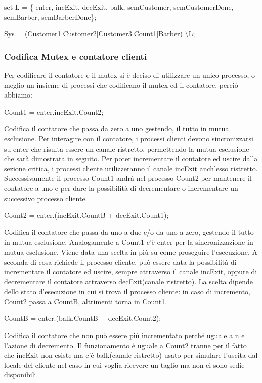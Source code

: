 \textsf{set L = \{ enter, incExit, decExit, balk, semCustomer, semCustomerDone, semBarber, semBarberDone\}};

\textsf{Sys = (Customer1|Customer2|Customer3|Count1|Barber) \textbackslash L;}

\subsubsection{Codifica Mutex e contatore clienti}

Per codificare il contatore e il \textsf{mutex} si è deciso di utilizzare un unico processo, o meglio un insieme di processi che codificano il \textsf{mutex} ed il contatore, perciò abbiamo: 

\textsf{Count1 = enter.incExit.Count2;}

Codifica il contatore che passa da zero a uno gestendo, il tutto in mutua esclusione. Per interagire con il contatore, i processi clienti devono sincronizzarsi su \textsf{enter} che risulta essere un canale ristretto, permettendo la mutua esclusione che sarà dimostrata in seguito. Per poter incrementare il contatore ed uscire dalla sezione critica, i processi cliente utilizzeranno il canale \textsf{incExit} anch'esso ristretto. Successivamente il processo \textsf{Count1} andrà nel processo \textsf{Count2} per mantenere il contatore a uno e per dare la possibilità di decrementare o incrementare un successivo processo cliente.

\textsf{Count2 = enter.(incExit.CountB + decExit.Count1);}

Codifica il contatore che passa da uno a due e/o da uno a zero, gestendo il tutto in mutua esclusione. Analogamente a \textsf{Count1} c'è \textsf{enter} per la sincronizzazione in mutua esclusione. Viene data una scelta in più su come proseguire l'esecuzione. A seconda di cosa richiede il processo cliente, può essere data la possibilità di incrementare il contatore ed uscire, sempre attraverso il canale \textsf{incExit}, oppure di decrementare il contatore attraverso \textsf{decExit}(canale ristretto). La scelta dipende dello stato d'esecuzione in cui si trova il processo cliente: in caso di incremento, \textsf{Count2} passa a \textsf{CountB}, altrimenti torna in \textsf{Count1}.

\textsf{CountB = enter.(balk.CountB + decExit.Count2);}

Codifica il contatore che non può essere più incrementato perché uguale a n e l'azione di decremento. Il funzionamento è uguale a \textsf{Count2} tranne per il fatto che \textsf{incExit} non esiste ma c'è \textsf{balk}(canale ristretto) usato per simulare l'uscita dal locale del cliente nel caso in cui voglia ricevere un taglio ma non ci sono sedie disponibili.

